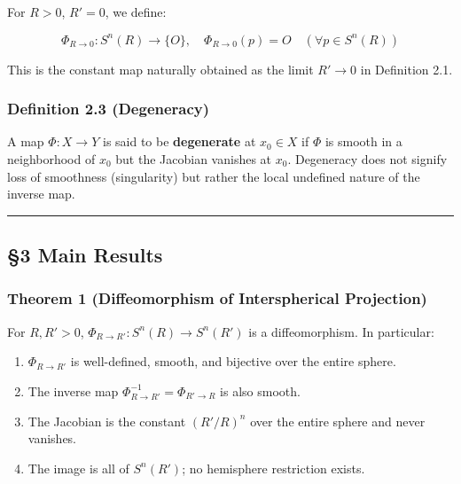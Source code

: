 \documentclass[
  a4paper]{article}
\providecommand{\tightlist}{%
  \setlength{\itemsep}{0pt}\setlength{\parskip}{0pt}}
\begin{document}
For \(R > 0\), \(R' = 0\), we define:

\[
\Phi_{R \to 0} : S^n(R) \to \{O\}, \quad \Phi_{R \to 0}(p) = O \quad (\forall p \in S^n(R))
\]

This is the constant map naturally obtained as the limit \(R' \to 0\) in
Definition 2.1.

\subsubsection{Definition 2.3
(Degeneracy)}\label{definition-2.3-degeneracy}

A map \(\Phi : X \to Y\) is said to be \textbf{degenerate} at
\(x_0 \in X\) if \(\Phi\) is smooth in a neighborhood of \(x_0\) but the
Jacobian vanishes at \(x_0\). Degeneracy does not signify loss of
smoothness (singularity) but rather the local undefined nature of the
inverse map.

\begin{center}\rule{0.5\linewidth}{0.5pt}\end{center}

\subsection{§3 Main Results}\label{main-results}

\subsubsection{Theorem 1 (Diffeomorphism of Interspherical
Projection)}\label{theorem-1-diffeomorphism-of-interspherical-projection}

For \(R, R' > 0\), \(\Phi_{R \to R'} : S^n(R) \to S^n(R')\) is a
diffeomorphism. In particular:

\begin{enumerate}
\def\labelenumi{(\roman{enumi})}
\tightlist
\item
  \(\Phi_{R \to R'}\) is well-defined, smooth, and bijective over the
  entire sphere.\\
\item
  The inverse map \(\Phi_{R \to R'}^{-1} = \Phi_{R' \to R}\) is also
  smooth.\\
\item
  The Jacobian is the constant \((R'/R)^n\) over the entire sphere and
  never vanishes.\\
\item
  The image is all of \(S^n(R')\); no hemisphere restriction exists.
\end{enumerate}
\end{document}
